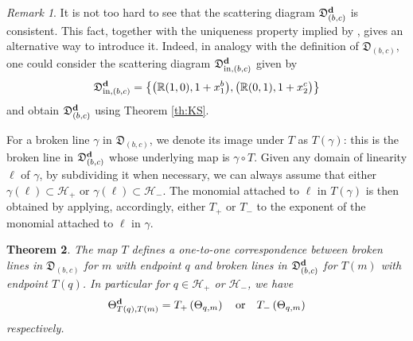 \documentclass[11pt]{amsart}
\newtheorem{theorem}{Theorem}[section]
\theoremstyle{remark}
\newtheorem{remark}[theorem]{Remark}
\numberwithin{equation}{section}
\newcommand{\RR}{\mathbb{R}}
\newcommand{\fD}{\mathfrak{D}}
\newcommand{\bfd}{{\bf d}}
\begin{document}
\begin{remark}
  It is not too hard to see that the scattering diagram $\fD_{(b,c)}^\bfd$ is
  consistent. This fact, together with the uniqueness property implied by
  \cite[Theorem 1.7]{GHKK}, gives an alternative way to introduce it. Indeed, in
  analogy with the definition of $\fD_{(b,c)}$, one could consider the
  scattering diagram
  $\fD_{\mathrm{in},(b,c)}^\bfd$ given by 
  \[
    \fD_{\mathrm{in},(b,c)}^\bfd=
    \left\{
      \big(\RR (1,0), 1+x_1^b\big), 
      \big(\RR (0,1), 1+x_2^c\big)
    \right\}
  \]
  and obtain $\fD_{(b,c)}^\bfd$ using Theorem \ref{th:KS}. 
\end{remark}

For a broken line $\gamma$ in $\fD_{(b,c)}$, we denote its image under $T$ as
$T(\gamma)$: this is the broken line in $\fD_{(b,c)}^\bfd$ whose underlying map
is $\gamma\circ T$. Given any domain of linearity $\ell$ of $\gamma$, by
subdividing it when necessary, we can always assume that either $\gamma(\ell)
\subset \mathcal{H}_{+} $ or $\gamma(\ell)\subset \mathcal{H}_{-}$. The monomial
attached to $\ell$ in $T(\gamma)$ is then obtained by applying, accordingly, either
$T_+$ or $T_-$ to the exponent of the monomial attached to $\ell$ in $\gamma$.

\begin{theorem}
  \label{thm:T_on_broken_lines}
  The map $T$ defines a one-to-one correspondence between broken lines in $\fD_{(b,c)}$
  for $m$ with endpoint $q$ and broken lines in $\fD_{(b,c)}^\bfd$ for $T(m)$
  with endpoint $T(q)$. In particular for $q \in \mathcal{H}_+$ or $\mathcal{H}_-$,
  we have
  \[ 
    \Theta^\bfd_{T(q),T( m)} = 
    T_{+} \left(\Theta_{q, m}\right) 
    \quad
    \mbox{or} 
    \quad
    T_{-} \left(\Theta_{q, m}\right)
  \]
  respectively.
\end{theorem}
\end{document}
